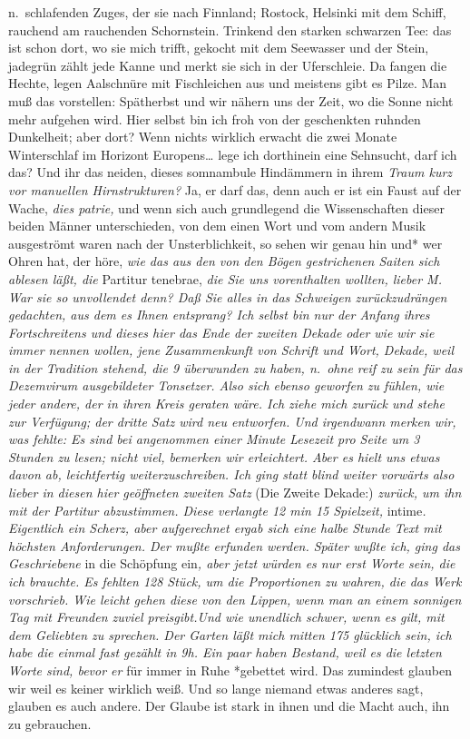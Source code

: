 \documentclass[
]{article}
\begin{document}
n.~schlafenden Zuges, der sie nach Finnland; Rostock, Helsinki mit dem
Schiff, rauchend am rauchenden Schornstein. Trinkend den starken
schwarzen Tee: das ist schon dort, wo sie mich trifft, gekocht mit dem
Seewasser und der Stein, jadegrün zählt jede Kanne und merkt sie sich in
der Uferschleie. Da fangen die Hechte, legen Aalschnüre mit Fischleichen
aus und meistens gibt es Pilze. Man muß das vorstellen: Spätherbst und
wir nähern uns der Zeit, wo die Sonne nicht mehr aufgehen wird. Hier
selbst bin ich froh von der geschenkten ruhnden Dunkelheit; aber dort?
Wenn nichts wirklich erwacht die zwei Monate Winterschlaf im Horizont
Europens\ldots{} lege ich dorthinein eine Sehnsucht, darf ich das? Und
ihr das neiden, dieses somnambule Hindämmern in ihrem \emph{Traum kurz
vor manuellen Hirnstrukturen? }Ja, er darf das, denn auch er ist ein
Faust auf der Wache, \emph{dies patrie, }und wenn sich auch grundlegend
die Wissenschaften dieser beiden Männer unterschieden, von dem einen
Wort und vom andern Musik ausgeströmt waren nach der Unsterblichkeit, so
sehen wir genau hin und* wer Ohren hat, der höre, \emph{wie das aus den
von den Bögen gestrichenen Saiten sich ablesen läßt, die }Partitur
tenebrae, \emph{die Sie uns vorenthalten wollten, lieber M. War sie so
unvollendet denn? Daß Sie alles in das Schweigen zurückzudrängen
gedachten, aus dem es Ihnen entsprang? Ich selbst bin nur der Anfang
ihres Fortschreitens und dieses hier das Ende der zweiten Dekade oder
wie wir sie immer nennen wollen, jene Zusammenkunft von Schrift und
Wort, Dekade, weil in der Tradition stehend, die 9 überwunden zu haben,
n.~ohne reif zu sein für das Dezemvirum ausgebildeter Tonsetzer. Also
sich ebenso geworfen zu fühlen, wie jeder andere, der in ihren Kreis
geraten wäre. Ich ziehe mich zurück und stehe zur Verfügung; der dritte
Satz wird neu entworfen. Und irgendwann merken wir, was fehlte: Es sind
bei angenommen einer Minute Lesezeit pro Seite um 3 Stunden zu lesen;
nicht viel, bemerken wir erleichtert. Aber es hielt uns etwas davon ab,
leichtfertig weiterzuschreiben. Ich ging statt blind weiter vorwärts
also lieber in diesen hier geöffneten zweiten Satz }(Die Zweite Dekade:)
\emph{zurück, um ihn mit der Partitur abzustimmen. Diese verlangte 12
min 15 Spielzeit, }intime\emph{. Eigentlich ein Scherz, aber
aufgerechnet ergab sich eine halbe Stunde Text mit höchsten
Anforderungen. Der mußte erfunden werden. Später wußte ich, ging das
Geschriebene }in die Schöpfung ein\emph{, aber jetzt würden es nur erst
Worte sein, die ich brauchte. Es fehlten 128 Stück, um die Proportionen
zu wahren, die das Werk vorschrieb. Wie leicht gehen diese von den
Lippen, wenn man an einem sonnigen Tag mit Freunden zuviel preisgibt.Und
wie unendlich schwer, wenn es gilt, mit dem Geliebten zu sprechen. Der
Garten läßt mich mitten 175 glücklich sein, ich habe die einmal fast
gezählt in 9h. Ein paar haben Bestand, weil es die letzten Worte sind,
bevor er }für immer in Ruhe *gebettet wird. Das zumindest glauben wir
weil es keiner wirklich weiß. Und so lange niemand etwas anderes sagt,
glauben es auch andere. Der Glaube ist stark in ihnen und die Macht
auch, ihn zu gebrauchen.
\end{document}
